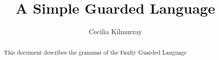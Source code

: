 \documentclass[runningheads,a4paper]{llncs}
\newcommand{\keywords}[1]{\par\addvspace\baselineskip
\noindent\keywordname\enspace\ignorespaces#1}
\begin{document}
\mainmatter  


\title{A Simple Guarded Language }


\author{Cecilia Kilmurray}


\maketitle

\begin{abstract}
	This document describes the grammar of the Faulty Guarded Language
\keywords{}
\end{abstract}






%
%
\end{document}
